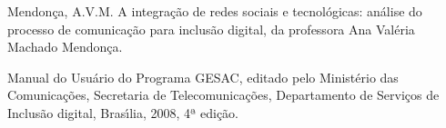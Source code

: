 \documentclass[
12pt,		%
openright,	%
twoside,  %
a4paper,			%
chapter=TITLE,		%
english,			%
french,				%
spanish,			%
brazil				%
]{USPSC-classe/USPSC}
\begin{document}
\begin{flushleft}
\begin{flushleft}
\begin{flushleft}
\begin{flushleft}
\begin{flushleft}
\begin{flushleft}
\begin{flushleft}
\begin{flushleft}
[MENDON\c{C}A, 2015] Mendon\c{c}a, A.V.M. A integra\c{c}\~ao de redes sociais e tecnol\'ogicas: an\'alise do processo de comunica\c{c}\~ao para inclus\~ao digital, da professora Ana Val\'eria  Machado  Mendon\c{c}a.
\end{flushleft}


\end{flushleft}


\end{flushleft}


\end{flushleft}


\end{flushleft}


\end{flushleft}


\end{flushleft}


\end{flushleft}


\begin{flushleft}
\begin{flushleft}
\begin{flushleft}
\begin{flushleft}
\begin{flushleft}
\begin{flushleft}
\begin{flushleft}
\begin{flushleft}
[MC, 2008] Manual do Usu\'ario do Programa GESAC, editado pelo Minist\'erio das Comunica\c{c}\~oes, Secretaria de Telecomunica\c{c}\~oes, Departamento de Servi\c{c}os de Inclus\~ao digital,  Bras\'{\i}lia, 2008, 4ª edi\c{c}\~ao.
\end{flushleft}


\end{flushleft}


\end{flushleft}


\end{flushleft}


\end{flushleft}


\end{flushleft}


\end{flushleft}


\end{flushleft}
\end{document}
